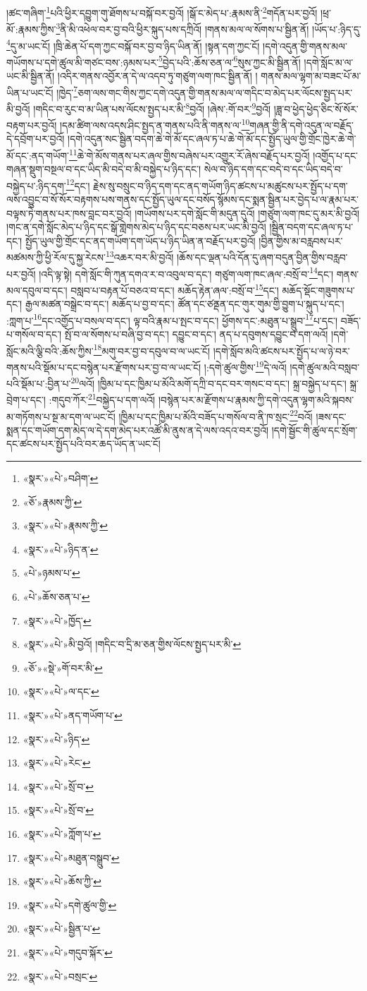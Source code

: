 །ཚང་གཞིག་\footnote{«སྣར་»«པེ་»བཤིག་}པའི་ཕྱིར་དབྱུག་གུ་ཐོགས་པ་བསྐོ་བར་བྱའོ། །སྒོ་ང་མེད་པ་:རྣམས་ནི་\footnote{«ཅོ་»རྣམས་ཀྱི་}གདོན་པར་བྱའོ། །ཕྲ་མོ་:རྣམས་ཀྱིས་\footnote{«སྣར་»«པེ་»རྣམས་ཀྱི་}ནི་མི་འཕེལ་བར་བྱ་བའི་ཕྱིར་སྐུད་པས་དཀྲིའོ། །གནས་མལ་ལ་སོགས་པ་སྦྱིན་ནོ། །ཡོད་པ་:ཉིད་དུ་\footnote{«སྣར་»«པེ་»ཉིད་ན་}དུ་མ་ཡང་ངོ། །ཁྲི་ཆེན་པོ་དག་ཀྱང་བསྐོ་བར་བྱ་བ་ཉིད་ཡིན་ནོ། །སྟན་དག་ཀྱང་ངོ། །དགེ་འདུན་གྱི་གནས་མལ་གཡོགས་པ་དགེ་ཚུལ་མི་གཙང་བས་:ཉམས་པར་\footnote{«པེ་»ཉམས་པ་}བྱེད་པའི་:ཆོས་ཅན་ལ་\footnote{«པེ་»ཆོས་ཅན་པ་}སུས་ཀྱང་མི་སྦྱིན་ནོ། །དགེ་སློང་མ་ལ་ཡང་མི་སྦྱིན་ནོ། །འདིར་གནས་འབྱོར་ན་དེ་ལ་འདབ་ཏུ་གཙུག་ལག་ཁང་སྦྱིན་ནོ། །
གནས་མལ་ལྷག་མ་བཟང་པོ་མ་ཡིན་པ་ཡང་ངོ། །ཁྱེད་\footnote{«སྣར་»«པེ་»ཁྱོད་}ཅག་ལས་གང་གིས་ཀྱང་དགེ་འདུན་གྱི་གནས་མལ་ལ་གདིང་བ་མེད་པར་ལོངས་སྤྱད་པར་མི་བྱའོ། །གདིང་བ་རུང་བ་མ་ཡིན་པས་ལོངས་སྤྱད་པར་མི་\footnote{«སྣར་»«པེ་»མི་བྱའོ། །གདིང་བ་དྲི་མ་ཅན་གྱིས་ལོངས་སྤྱད་པར་མི་}བྱའོ། །ཞེས་:གོ་བར་\footnote{«ཅོ་»«སྡེ་»གོ་བར་མི་}བྱའོ། །ཟླ་བ་ཕྱེད་ཕྱེད་ཅིང་སོ་སོར་བརྟག་པར་བྱའོ། །དམ་ཚིག་ལས་འདས་ཤིང་སྤྱད་ན་གནས་པའི་ནི་གནས་ལ་\footnote{«སྣར་»«པེ་»ལ་དང་}གཞན་གྱི་ནི་དགེ་འདུན་ལ་བརྗོད་དེ་དབྲོག་པར་བྱའོ། །དགེ་འདུན་སང་སྦྱིན་བདག་ཆེ་གེ་མོ་དང་ཞལ་ཏ་པ་ཆེ་གེ་མོ་དང་སྤྱོད་ཡུལ་གྱི་གྲོང་ཁྱེར་ཆེ་གེ་མོ་དང་:ནད་གཡོག་\footnote{«སྣར་»«པེ་»ནད་གཡོག་པ་}ཆེ་གེ་མོས་གནས་པར་ཞལ་གྱིས་བཞེས་པར་འགྱུར་རོ་ཞེས་བརྗོད་པར་བྱའོ། །འགྱོད་པ་དང་གཞན་སྡུག་བསྔལ་བ་དང་ཡིད་མི་བདེ་བ་མི་བསྐྱེད་པ་ཉིད་དང་། སེལ་བ་ཉིད་དག་དང་བདེ་བ་དང་ཡིད་བདེ་བ་བསྐྱེད་པ་:ཉིད་དག་\footnote{«སྣར་»«པེ་»ཉིད་}དང་། རྗེས་སུ་བསྲུང་བ་ཉིད་དག་དང་ནད་གཡོག་ཉིད་ཚངས་པ་མཚུངས་པར་སྤྱོད་པ་དག་ལས་འབྱུང་བ་སོ་སོར་བརྟགས་པས་གནས་དང་སྤྱོད་ཡུལ་དང་བསོད་སྙོམས་དང་སྨན་སྦྱིན་པར་བྱེད་པ་ལ་རྣམ་པར་བལྟས་ཏེ་གནས་པར་ཁས་བླང་བར་བྱའོ། །གཡོགས་པར་དགེ་སློང་གི་མདུན་དུའོ། །གཙུག་ལག་ཁང་དུ་མར་མི་བྱའོ། །གང་ན་དགེ་སློང་མེད་པ་ཉིད་དང་སྒོ་གླེགས་མེད་པ་ཉིད་དང་བཅས་པར་ཡང་མི་བྱའོ། །སྦྱིན་བདག་དང་ཞལ་ཏ་པ་དང་། སྤྱོད་ཡུལ་གྱི་གྲོང་དང་ནད་གཡོག་དག་ཡོད་པ་ཉིད་ཡིན་ན་བརྗོད་པར་བྱའོ། །བྱིན་གྱིས་མ་བརླབས་པར་མཚམས་ཀྱི་ཕྱི་རོལ་དུ་སྐྱ་རེངས་\footnote{«སྣར་»«པེ་»རེང་}འཆར་བར་མི་བྱའོ། །ཆོས་དང་ལྡན་པའི་དོན་དུ་ཞག་བདུན་བྱིན་གྱིས་བརླབ་པར་བྱའོ། །འདི་ལྟ་སྟེ། དགེ་སློང་གི་ཀུན་དགའ་ར་བ་འབུལ་བ་དང་། གཙུག་ལག་ཁང་ཞལ་:བསྲོ་བ་\footnote{«སྣར་»«པེ་»སྲོ་བ་}དང་། གནས་མལ་དབུལ་བ་དང་། བསླབ་པ་བརྟན་པོ་བཅའ་བ་དང་། མཆོད་རྟེན་ཞལ་:བསྲོ་བ་\footnote{«སྣར་»«པེ་»སྲོ་བ་}དང་། མཆོད་སྡོང་གཟུགས་པ་དང་། རྒྱལ་མཚན་བསྒྲེང་བ་དང་། མཆོད་པ་བྱ་བ་དང་། ཚོན་དང་ཙནྡན་དང་གུར་གུམ་གྱི་བྱུག་པ་སྐུད་པ་དང་། :ཀླག་པ་\footnote{«སྣར་»«པེ་»ཀློག་པ་}དང་འགྱོད་པ་བསལ་བ་དང་། ལྟ་བའི་རྣམ་པ་སྤང་བ་དང་། ཕྱོགས་དང་:མཐུན་པ་སྒྲུབ་\footnote{«སྣར་»«པེ་»མཐུན་བསྒྲུབ་}པ་དང་། བཟོད་པ་གསོལ་བ་དང་། སྤོ་བ་ལ་སོགས་པ་བཞི་བྱ་བ་དང་། དབྱུང་བ་དང་། ནད་པ་དབུགས་དབྱུང་བ་དག་ལའོ། །དགེ་སློང་མའི་ལྕི་བའི་:ཆོས་ཀྱིས་\footnote{«སྣར་»«པེ་»ཆོས་ཀྱི་}མགུ་བར་བྱ་བ་དབུལ་བ་ལ་ཡང་ངོ། །དགེ་སློབ་མའི་ཚངས་པར་སྤྱོད་པ་ལ་ཉེ་བར་གནས་པའི་སྡོམ་པ་དང་བསྙེན་པར་རྫོགས་པར་བྱ་བ་ལ་ཡང་ངོ། །:དགེ་ཚུལ་གྱིས་\footnote{«སྣར་»«པེ་»དགེ་ཚུལ་གྱི་}དེ་ལའོ། །དགེ་ཚུལ་མའི་བསླབ་པའི་སྡོམ་པ་:བྱིན་པ་\footnote{«སྣར་»«པེ་»སྦྱིན་པ་}ལའོ། །ཁྱིམ་པ་དང་ཁྱིམ་པ་མོའི་མགོ་དཀྲི་བ་དང་བར་གསང་བ་དང་། སྐྲ་བསྐྱེད་པ་དང་། སྐྲ་བྲེག་པ་དང་། :གདུབ་ཀོར་\footnote{«སྣར་»«པེ་»གདུབ་སྐོར་}བསྐྱེད་པ་དག་ལའོ། །བསྙེན་པར་མ་རྫོགས་པ་རྣམས་ཀྱི་དགེ་འདུན་ལྷག་མའི་སྐབས་མ་གཏོགས་པ་སྔ་མ་དག་ལ་ཡང་ངོ། །ཁྱིམ་པ་དང་ཁྱིམ་པ་མོའི་བཟོད་པ་གསོལ་བ་ནི་ཁ་སྲང་\footnote{«སྣར་»«པེ་»བསྲང་}བའོ། །ཟས་དང་སྨན་དང་གཡོག་དག་མེད་ལ་དེ་དག་མེད་པར་འཚོ་མི་ནུས་ན་དེ་ལས་འདའ་བར་བྱའོ། །དགེ་སྦྱོང་གི་ཚུལ་དང་སྲོག་དང་ཚངས་པར་སྤྱོད་པའི་བར་ཆད་ཡོད་ན་ཡང་ངོ། 